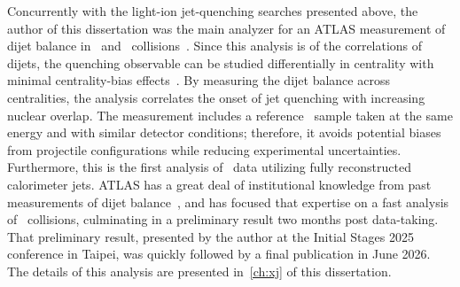Concurrently with the light-ion jet-quenching searches presented above, the author of this dissertation was the main analyzer for an ATLAS measurement of dijet balance in \OxO\ and \NexNe\ collisions~\cite{HION-2025-16}.
Since this analysis is of the correlations of dijets, the quenching observable can be studied differentially in centrality with minimal centrality-bias effects~\cite{CentBias:OO}.
By measuring the dijet balance across centralities, the analysis correlates the onset of jet quenching with increasing nuclear overlap.
The measurement includes a reference \pxp\ sample taken at the same energy and with similar detector conditions; therefore, it avoids potential biases from projectile configurations while reducing experimental uncertainties.
Furthermore, this is the first analysis of \OxO\ data utilizing fully reconstructed calorimeter jets.
ATLAS has a great deal of institutional knowledge from past measurements of dijet balance~\cite{HION-2010-02,HION-2012-11,HION-2019-02,HION-2018-28,HION-2024-03}, and has focused that expertise on a fast analysis of \OxO\ collisions, culminating in a preliminary result two months post data-taking.
That preliminary result, presented by the author at the Initial Stages 2025 conference in Taipei, was quickly followed by a final publication in June 2026.
The details of this analysis are presented in~\ref{ch:xj} of this dissertation.
